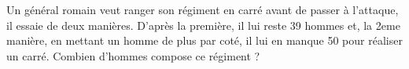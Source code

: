 Un général romain veut ranger son régiment en carré avant de passer à l'attaque, 
il essaie de deux manières. 
D'après la première, il lui reste 39 hommes et, la 2eme manière, 
en mettant un homme de plus par coté, il lui en manque 50 pour réaliser un carré. 
Combien d'hommes compose ce régiment ?
